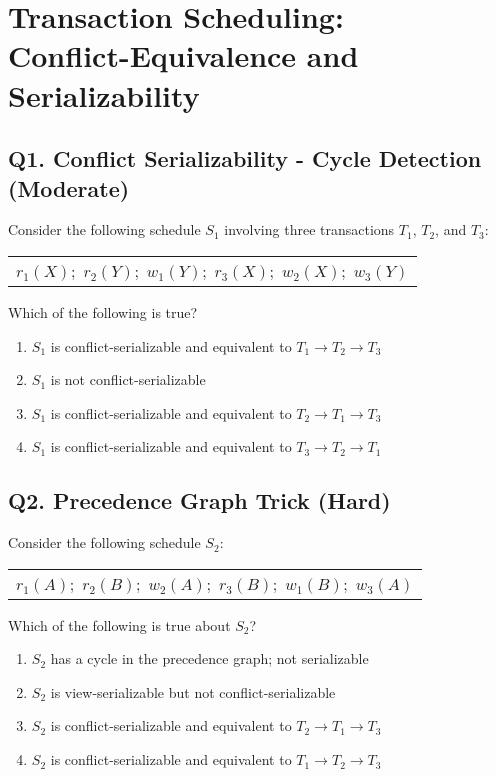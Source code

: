 \section[Transaction Scheduling: Conflict-Equivalence and Serializability]
{Transaction Scheduling:\\ Conflict-Equivalence and Serializability}

\subsection*{Q1. Conflict Serializability - Cycle Detection (Moderate)}
Consider the following schedule $S_1$ involving three transactions $T_1$, $T_2$, and $T_3$:

\begin{center}
\begin{tabular}{l}
    $r_1(X);$ $r_2(Y);$ $w_1(Y);$ $r_3(X);$ $w_2(X);$ $w_3(Y)$
\end{tabular}
\end{center}

Which of the following is true?
\begin{enumerate}[label=(\alph*)]
    \item $S_1$ is conflict-serializable and equivalent to $T_1 \rightarrow T_2 \rightarrow T_3$
    \item $S_1$ is not conflict-serializable
    \item $S_1$ is conflict-serializable and equivalent to $T_2 \rightarrow T_1 \rightarrow T_3$
    \item $S_1$ is conflict-serializable and equivalent to $T_3 \rightarrow T_2 \rightarrow T_1$
\end{enumerate}

\subsection*{Q2. Precedence Graph Trick (Hard)}
Consider the following schedule $S_2$:

\begin{center}
\begin{tabular}{l}
    $r_1(A);$ $r_2(B);$ $w_2(A);$ $r_3(B);$ $w_1(B);$ $w_3(A)$
\end{tabular}
\end{center}

Which of the following is true about $S_2$?

\begin{enumerate}[label=(\alph*)]
    \item $S_2$ has a cycle in the precedence graph; not serializable
    \item $S_2$ is view-serializable but not conflict-serializable
    \item $S_2$ is conflict-serializable and equivalent to $T_2 \rightarrow T_1 \rightarrow T_3$
    \item $S_2$ is conflict-serializable and equivalent to $T_1 \rightarrow T_2 \rightarrow T_3$
\end{enumerate}

